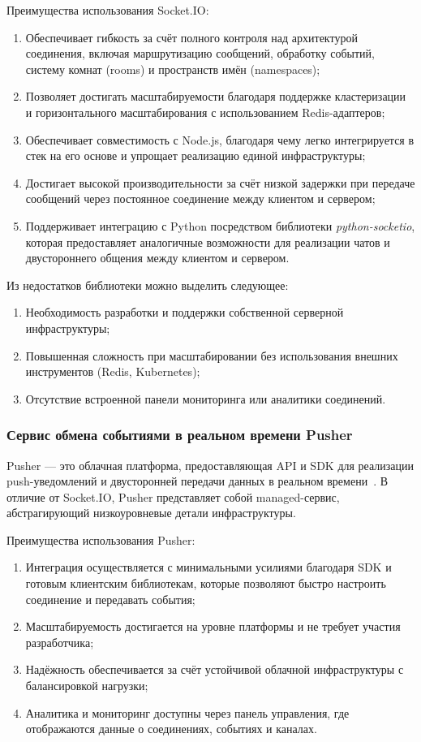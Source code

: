 Преимущества использования Socket.IO:
\begin{enumerate}
  \item Обеспечивает гибкость за счёт полного контроля над архитектурой соединения, включая маршрутизацию сообщений, обработку событий, систему комнат (rooms) и пространств имён (namespaces);
  \item Позволяет достигать масштабируемости благодаря поддержке кластеризации и горизонтального масштабирования с использованием Redis-адаптеров;
  \item Обеспечивает совместимость с Node.js, благодаря чему легко интегрируется в стек на его основе и упрощает реализацию единой инфраструктуры;
  \item Достигает высокой производительности за счёт низкой задержки при передаче сообщений через постоянное соединение между клиентом и сервером;
  \item Поддерживает интеграцию с Python посредством библиотеки \textit{python-socketio}, которая предоставляет аналогичные возможности для реализации чатов и двустороннего общения между клиентом и сервером.
\end{enumerate}


Из недостатков библиотеки можно выделить следующее:
\begin{enumerate}
  \item Необходимость разработки и поддержки собственной серверной инфраструктуры;
  \item Повышенная сложность при масштабировании без использования внешних инструментов (Redis, Kubernetes);
  \item Отсутствие встроенной панели мониторинга или аналитики соединений.
\end{enumerate}

\subsubsection*{Сервис обмена событиями в реальном времени Pusher}

Pusher — это облачная платформа, предоставляющая API и SDK для реализации push-уведомлений и двусторонней передачи данных в реальном времени~\cite{pusher_docs}. В отличие от Socket.IO, Pusher представляет собой managed-сервис, абстрагирующий низкоуровневые детали инфраструктуры.

Преимущества использования Pusher:
\begin{enumerate}
  \item Интеграция осуществляется с минимальными усилиями благодаря SDK и готовым клиентским библиотекам, которые позволяют быстро настроить соединение и передавать события;
  \item Масштабируемость достигается на уровне платформы и не требует участия разработчика;
  \item Надёжность обеспечивается за счёт устойчивой облачной инфраструктуры с балансировкой нагрузки;
  \item Аналитика и мониторинг доступны через панель управления, где отображаются данные о соединениях, событиях и каналах.
\end{enumerate}

